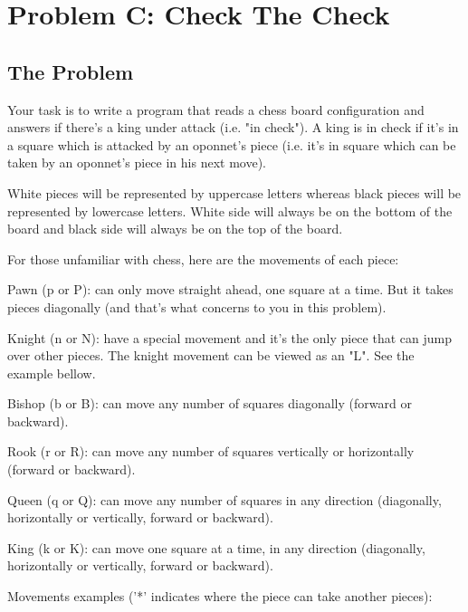 
 
\section{Problem C: Check The Check}





\subsection{The Problem}



Your task is to write a program that reads a chess board configuration and answers if
there's a king under attack (i.e. "in check"). A king is in check if it's in a square which
is attacked by an oponnet's piece (i.e. it's in square which can be taken by an oponnet's
piece in his next move).


White pieces will be represented by uppercase letters whereas black pieces will be represented by
lowercase letters. White side will always be on the bottom of the board and black side will always be
on the top of the board.


For those unfamiliar with chess, here are the movements of each piece:


Pawn (p or P): can only move straight ahead, one square at a time. But it takes pieces diagonally
(and that's what concerns to you in this problem).

Knight (n or N): have a special movement and it's the only piece that can jump over other pieces. The
knight movement can be viewed as an "L". See the example bellow.

Bishop (b or B): can move any number of squares diagonally (forward or backward).

Rook (r or R): can move any number of squares vertically or horizontally  (forward or backward).

Queen (q or Q): can move any number of squares in any direction (diagonally, horizontally or vertically,
forward or backward).

King (k or K): can move one square at a time, in any direction (diagonally, horizontally or vertically,
forward or backward).


Movements examples ('*' indicates where the piece can take another pieces):








